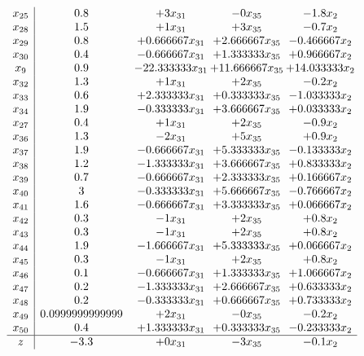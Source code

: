\documentclass[11pt]{article}
\begin{document}
\[\begin{array}{c| c c@{\hskip 2pt} c@{\hskip 2pt} c@{\hskip 2pt} }
 x_{25}   &  0.8 & + 3 x_{31} & -0 x_{35} & -1.8 x_{2}\\
 x_{28}   &  1.5 & + 1 x_{31} & + 3 x_{35} & -0.7 x_{2}\\
 x_{29}   &  0.8 & + 0.666667 x_{31} & + 2.666667 x_{35} & -0.466667 x_{2}\\
 x_{30}   &  0.4 & -0.666667 x_{31} & + 1.333333 x_{35} & + 0.966667 x_{2}\\
 x_{9}   &  0.9 & -22.333333 x_{31} & + 11.666667 x_{35} & + 14.033333 x_{2}\\
 x_{32}   &  1.3 & + 1 x_{31} & + 2 x_{35} & -0.2 x_{2}\\
 x_{33}   &  0.6 & + 2.333333 x_{31} & + 0.333333 x_{35} & -1.033333 x_{2}\\
 x_{34}   &  1.9 & -0.333333 x_{31} & + 3.666667 x_{35} & + 0.033333 x_{2}\\
 x_{27}   &  0.4 & + 1 x_{31} & + 2 x_{35} & -0.9 x_{2}\\
 x_{36}   &  1.3 & -2 x_{31} & + 5 x_{35} & + 0.9 x_{2}\\
 x_{37}   &  1.9 & -0.666667 x_{31} & + 5.333333 x_{35} & -0.133333 x_{2}\\
 x_{38}   &  1.2 & -1.333333 x_{31} & + 3.666667 x_{35} & + 0.833333 x_{2}\\
 x_{39}   &  0.7 & -0.666667 x_{31} & + 2.333333 x_{35} & + 0.166667 x_{2}\\
 x_{40}   &  3 & -0.333333 x_{31} & + 5.666667 x_{35} & -0.766667 x_{2}\\
 x_{41}   &  1.6 & -0.666667 x_{31} & + 3.333333 x_{35} & + 0.066667 x_{2}\\
 x_{42}   &  0.3 & -1 x_{31} & + 2 x_{35} & + 0.8 x_{2}\\
 x_{43}   &  0.3 & -1 x_{31} & + 2 x_{35} & + 0.8 x_{2}\\
 x_{44}   &  1.9 & -1.666667 x_{31} & + 5.333333 x_{35} & + 0.066667 x_{2}\\
 x_{45}   &  0.3 & -1 x_{31} & + 2 x_{35} & + 0.8 x_{2}\\
 x_{46}   &  0.1 & -0.666667 x_{31} & + 1.333333 x_{35} & + 1.066667 x_{2}\\
 x_{47}   &  0.2 & -1.333333 x_{31} & + 2.666667 x_{35} & + 0.633333 x_{2}\\
 x_{48}   &  0.2 & -0.333333 x_{31} & + 0.666667 x_{35} & + 0.733333 x_{2}\\
 x_{49}   &  0.0999999999999 & + 2 x_{31} & -0 x_{35} & -0.2 x_{2}\\
 x_{50}   &  0.4 & + 1.333333 x_{31} & + 0.333333 x_{35} & -0.233333 x_{2}\\
\hline
z    &  -3.3 & + 0 x_{31} & -3 x_{35} & -0.1 x_{2}\\
\end{array}\]
\end{document}
